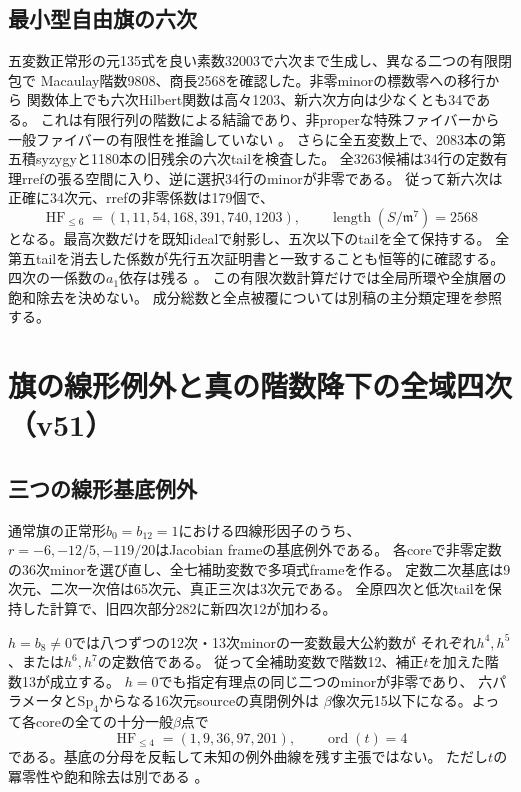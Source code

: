 \documentclass[11pt,a4paper]{ltjsarticle}
\theoremstyle{remark}
\begin{document}
\subsection{最小型自由旗の六次}
五変数正常形の元135式を良い素数32003で六次まで生成し、異なる二つの有限閉包で
Macaulay階数9808、商長2568を確認した。非零minorの標数零への移行から
関数体上でも六次Hilbert関数は高々1203、新六次方向は少なくとも34である。
これは有限行列の階数による結論であり、非properな特殊ファイバーから一般ファイバーの有限性を推論していない
\cite{free-six-upper-v50}。
さらに全五変数上で、2083本の第五積syzygyと1180本の旧残余の六次tailを検査した。
全3263候補は34行の定数有理rrefの張る空間に入り、逆に選択34行のminorが非零である。
従って新六次は正確に34次元、rrefの非零係数は179個で、
\[
 \operatorname{HF}_{\le6}=(1,11,54,168,391,740,1203),\qquad
 \operatorname{length}(S/\mathfrak m^7)=2568
\]
となる。最高次数だけを既知idealで射影し、五次以下のtailを全て保持する。
全第五tailを消去した係数が先行五次証明書と一致することも恒等的に確認する。
四次の一係数の$a_1$依存は残る
\cite{free-six-exact-v50}。
この有限次数計算だけでは全局所環や全旗層の飽和除去を決めない。
成分総数と全点被覆については別稿の主分類定理を参照する。

\section{旗の線形例外と真の階数降下の全域四次（v51）}
\label{sec:v51}

\subsection{三つの線形基底例外}
通常旗の正常形$b_0=b_{12}=1$における四線形因子のうち、
$r=-6,-12/5,-119/20$はJacobian frameの基底例外である。
各coreで非零定数の36次minorを選び直し、全七補助変数で多項式frameを作る。
定数二次基底は9次元、二次一次倍は65次元、真正三次は3次元である。
全原四次と低次tailを保持した計算で、旧四次部分282に新四次12が加わる。

$h=b_8\ne0$では八つずつの12次・13次minorの一変数最大公約数が
それぞれ$h^4,h^5$、または$h^6,h^7$の定数倍である。
従って全補助変数で階数12、補正$t$を加えた階数13が成立する。
$h=0$でも指定有理点の同じ二つのminorが非零であり、
六パラメータと$\mathrm{Sp}_4$からなる16次元sourceの真閉例外は
$\beta$像次元15以下になる。よって各coreの全ての十分一般$\beta$点で
\[
 \operatorname{HF}_{\le4}=(1,9,36,97,201),\qquad \operatorname{ord}(t)=4
\]
である。基底の分母を反転して未知の例外曲線を残す主張ではない。
ただし$t$の冪零性や飽和除去は別である
\cite{flag-linear-cover-v51}。
\end{document}
